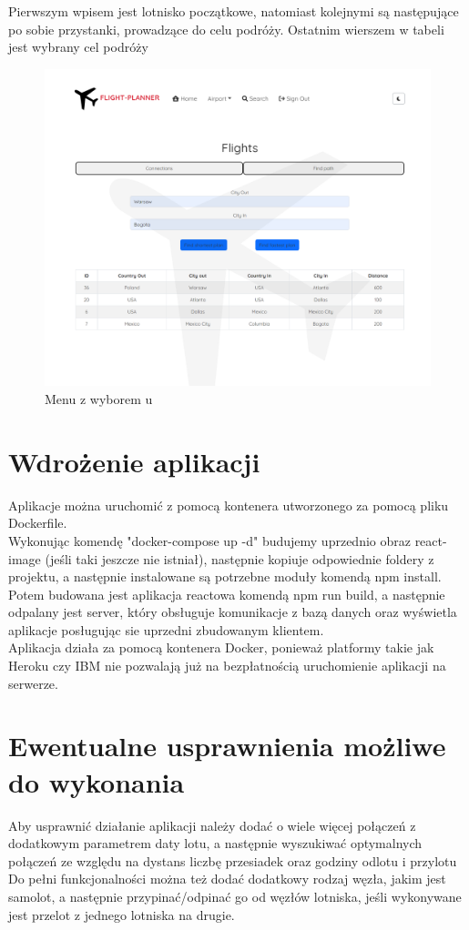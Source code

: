 \documentclass[12pt]{article}
\begin{document}
Pierwszym wpisem jest lotnisko początkowe, natomiast kolejnymi są następujące po sobie przystanki, prowadzące do celu podróży.
Ostatnim wierszem w tabeli jest wybrany cel podróży
\begin{figure}[!ht]
    \centering
    \includegraphics[width=0.55\linewidth]{8}  
    \caption{Menu z wyborem u}
\end{figure}
\newpage
\section{Wdrożenie aplikacji}
Aplikacje można uruchomić z pomocą kontenera utworzonego za pomocą pliku Dockerfile.\\
Wykonując komendę "docker-compose up -d" budujemy uprzednio obraz react-image (jeśli taki jeszcze nie istniał), następnie
kopiuje odpowiednie foldery z projektu, a następnie instalowane są potrzebne moduły komendą npm install. Potem budowana jest aplikacja reactowa komendą npm run build, a następnie odpalany jest server, który obsługuje komunikacje z bazą danych oraz wyświetla aplikacje posługując sie uprzedni zbudowanym klientem.\\
Aplikacja działa za pomocą kontenera Docker, ponieważ platformy takie jak Heroku czy IBM nie pozwalają już na bezpłatnością uruchomienie aplikacji na serwerze.

\section{Ewentualne usprawnienia możliwe do wykonania}
Aby usprawnić działanie aplikacji należy dodać o wiele więcej połączeń z dodatkowym parametrem daty lotu, a następnie wyszukiwać optymalnych połączeń ze względu na dystans liczbę przesiadek oraz godziny odlotu i przylotu\\
Do pełni funkcjonalności można też dodać dodatkowy rodzaj węzła, jakim jest samolot, a następnie przypinać/odpinać go od węzłów lotniska, jeśli wykonywane jest przelot z jednego lotniska na drugie.
\end{document}

